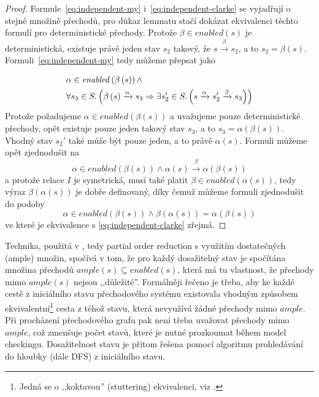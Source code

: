 \documentclass[12pt]{fithesis2}
\begin{document}
\begin{proof}
Formule~\ref{eq:independent-my} i~\ref{eq:independent-clarke} se vyjadřují o stejné množině přechodů, pro důkaz lemmatu stačí dokázat ekvivalenci těchto formulí pro deterministické přechody. Protože $\beta \in \mathit{enabled}(s)$ je deterministická, existuje právě jeden stav $s_2$ takový, že $s \xrightarrow{\beta} s_2$, a to $s_2 = \beta\left({s}\right)$. Formuli~\ref{eq:independent-my} tedy můžeme přepsat jako

\begin{equation}
\begin{split}
& \alpha \in \mathit{enabled}\left({\beta\left({s}\right)}\right)
\land \\
&\forall s_3 \in S \ldotp \left({
	\beta\left({s}\right) \xrightarrow{\alpha} s_3
	\Rightarrow
	\exists s_2' \in S \ldotp \left({
		s \xrightarrow{\alpha} s_2' \xrightarrow{\beta} s_3
	}\right)
}\right)
\end{split}
\end{equation}
Protože požadujeme $\alpha \in \mathit{enabled}\left({\beta\left({s}\right)}\right)$ a uvažujeme pouze deterministické přechody, opět existuje pouze jeden takový stav $s_3$, a to $s_3 = \alpha{\left({\beta\left({s}\right)}\right)}$. Vhodný stav $s_2'$ také může být pouze jeden, a to právě $\alpha\left({s}\right)$. Formuli můžeme opět zjednodušit na
\begin{equation}
\alpha \in \mathit{enabled}\left({\beta\left({s}\right)}\right)
\land
\alpha\left({s}\right) \xrightarrow{\beta} \alpha{\left({\beta\left({s}\right)}\right)}
\end{equation}
a protože relace $I$ je symetrická, musí také platit $\beta \in \mathit{enabled}\left({\alpha\left({s}\right)}\right)$, tedy výraz $\beta\left({\alpha\left({s}\right)}\right)$ je dobře definovaný, díky čemuž můžeme formuli zjednodušit do podoby
\begin{equation}
\alpha \in \mathit{enabled}\left({\beta\left({s}\right)}\right)
\land
\beta\left({\alpha\left({s}\right)}\right) = \alpha{\left({\beta\left({s}\right)}\right)}
\end{equation}
ve které je ekvivalence s \ref{eq:independent-clarke} zřejmá.
\end{proof}



Technika, použitá v \cite{CLARKE}, tedy partial order reduction s využitím dostatečných (ample) množin, spočívá v tom, že pro každý dosažitelný stav je spočítána množina přechodů $\mathit{ample}(s) \subseteq \mathit{enabled}(s)$, která má tu vlastnost, že přechody mimo $\mathit{ample}(s)$ nejsou ,,důležité''. Formálněji řečeno je třeba, aby ke každé cestě z iniciálního stavu přechodového systému existovala vhodným způsobem ekvivalentní\footnote{Jedná se o ,,koktavou'' (stuttering) ekvivalenci, viz \cite{CLARKE}.} cesta z téhož stavu, která nevyužívá žádné přechody mimo $\mathit{ample}$. Při procházení přechodového grafu pak není třeba uvažovat přechody mimo $\mathit{ample}$, což zmenšuje počet stavů, které je nutné prozkoumat během model checkingu. Dosažitelnost stavu je přitom řešena pomocí algoritmu prohledávání do hloubky (dále DFS) z iniciálního stavu.
\end{document}
